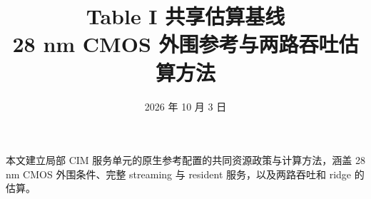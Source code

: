 \documentclass[11pt,a4paper,fontset=fandol]{ctexart}
\title{\bfseries Table I 共享估算基线\\[4pt]\large 28 nm CMOS 外围参考与两路吞吐估算方法}
\author{}
\date{2026 年 10 月 3 日}
\begin{document}
\maketitle
\vspace{-1.5em}
\noindent 本文建立局部 CIM 服务单元的原生参考配置的共同资源政策与计算方法，涵盖 28 nm CMOS 外围条件、完整 streaming 与 resident 服务，以及两路吞吐和 ridge 的估算。




\end{document}
